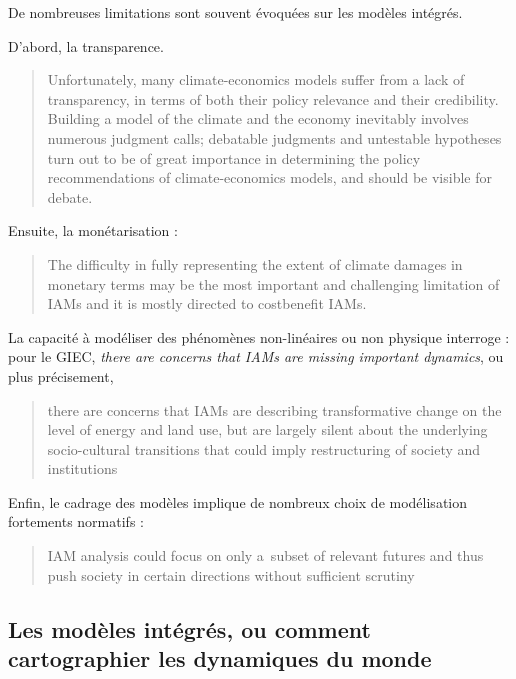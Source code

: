 De nombreuses limitations sont souvent évoquées sur les modèles intégrés. 

D'abord, la transparence.

\begin{quote}
    Unfortunately, many climate-economics models suffer from a lack of transparency, in terms of both their policy relevance and their credibility. Building a model of the climate and the economy inevitably involves numerous judgment calls; debatable judgments and untestable hypotheses turn out to be of great importance in determining the policy recommendations of climate-economics models, and should be visible for debate. \cite{stanton_inside_2009}
\end{quote}

Ensuite, la monétarisation : 

\begin{quote}
    The difficulty in fully representing the extent of climate damages in monetary terms may be the most important and challenging limitation of IAMs and it is mostly directed to costbenefit IAMs. \cite{intergovernmental_panel_on_climate_change_ipcc_annex_2023}
\end{quote}

La capacité à modéliser des phénomènes non-linéaires ou non physique interroge : pour le GIEC, \emph{there are concerns that IAMs are missing important dynamics}, ou plus précisement, 

\begin{quote}
    there are concerns that IAMs are describing transformative change on the level of energy and land use, but are largely silent about the underlying socio-cultural transitions that could imply restructuring of society and institutions
\end{quote}

Enfin, le cadrage des modèles implique de nombreux choix de modélisation fortements normatifs : 

\begin{quote}
    IAM analysis could focus on only a subset of relevant futures and thus push society in certain directions without sufficient scrutiny
\end{quote}

\subsection{Les modèles intégrés, ou comment cartographier les dynamiques du monde}
\label{sect:1.3.1}


